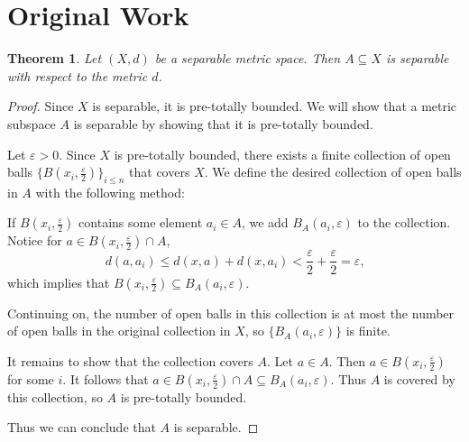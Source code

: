 \documentclass{article}
\theoremstyle{plain} %
\newtheorem{thm}{Theorem}
\numberwithin{thm}{section} %
\theoremstyle{definition}
\begin{document}
    \section{Original Work}
    \begin{thm}
        Let \((X, d)\) be a separable metric space. Then \(A \subseteq X\) is separable with respect to the metric \(d\).
    \end{thm}
    \begin{proof}
        Since \(X\) is separable, it is pre-totally bounded. We will show that a metric subspace \(A\) is separable by showing that it is pre-totally bounded.

        Let \(\varepsilon > 0\). Since \(X\) is pre-totally bounded, there exists a finite collection of open balls \(\{ B(x_i, \frac{\varepsilon}{2})\}_{i\leq n}\) that covers \(X\). We define the desired collection of open balls in \(A\) with the following method:

        If \(B(x_i, \frac{\varepsilon}{2})\) contains some element \(a_i \in A\), we add \(B_A(a_i, \varepsilon)\) to the collection. Notice for \(a \in B(x_i, \frac{\varepsilon}{2}) \cap A\),
        \[
            d(a,a_i) \leq d(x, a) + d(x,a_i) < \frac{\varepsilon}{2} + \frac{\varepsilon}{2} = \varepsilon \text{,} 
        \]
        which implies that \(B(x_i, \frac{\varepsilon}{2}) \subseteq B_A(a_i, \varepsilon)\).

        Continuing on, the number of open balls in this collection is at most the number of open balls in the original collection in \(X\), so \(\{B_A(a_i, \varepsilon)\}\) is finite.

        It remains to show that the collection covers \(A\). Let \(a \in A\). Then \(a \in B(x_i, \frac{\varepsilon}{2})\) for some \(i\). It follows that \(a \in B(x_i,\frac{\varepsilon}{2})\cap A \subseteq B_A(a_i, \varepsilon)\). Thus \(A\) is covered by this collection, so \(A\) is pre-totally bounded.

        Thus we can conclude that \(A\) is separable.

    \end{proof}
\end{document}

